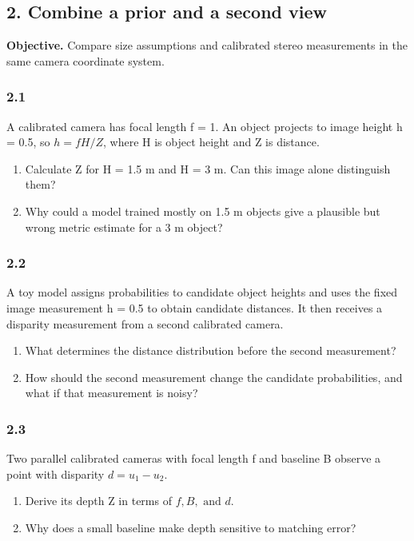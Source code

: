 \documentclass[11pt,a4paper]{article}
\begin{document}
\subsection*{2. Combine a prior and a second view}
\noindent\textbf{Objective.} Compare size assumptions and calibrated stereo measurements in the same camera coordinate system.
\par
\noindent
\begin{minipage}{\linewidth}
\subsubsection*{2.1}
A calibrated camera has focal length f = 1.
An object projects to image height h = 0.5, so $h=fH/Z$, where H is object height and Z is distance.
\begin{enumerate}[label=(\alph*),nosep]
\item Calculate Z for H = 1.5 m and H = 3 m.
Can this image alone distinguish them?
\item Why could a model trained mostly on 1.5 m objects give a plausible but wrong metric estimate for a 3 m object?
\end{enumerate}
\end{minipage}
\par\medskip
\par
\noindent
\begin{minipage}{\linewidth}
\subsubsection*{2.2}
A toy model assigns probabilities to candidate object heights and uses the fixed image measurement h = 0.5 to obtain candidate distances.
It then receives a disparity measurement from a second calibrated camera.
\begin{enumerate}[label=(\alph*),nosep]
\item What determines the distance distribution before the second measurement?
\item How should the second measurement change the candidate probabilities, and what if that measurement is noisy?
\end{enumerate}
\end{minipage}
\par\medskip
\par
\noindent
\begin{minipage}{\linewidth}
\subsubsection*{2.3}
Two parallel calibrated cameras with focal length f and baseline B observe a point with disparity $d=u_1-u_2$.
\begin{enumerate}[label=(\alph*),nosep]
\item Derive its depth Z in terms of $f,B,\text{ and }d$.
\item Why does a small baseline make depth sensitive to matching error?
\end{enumerate}
\end{minipage}
\end{document}
